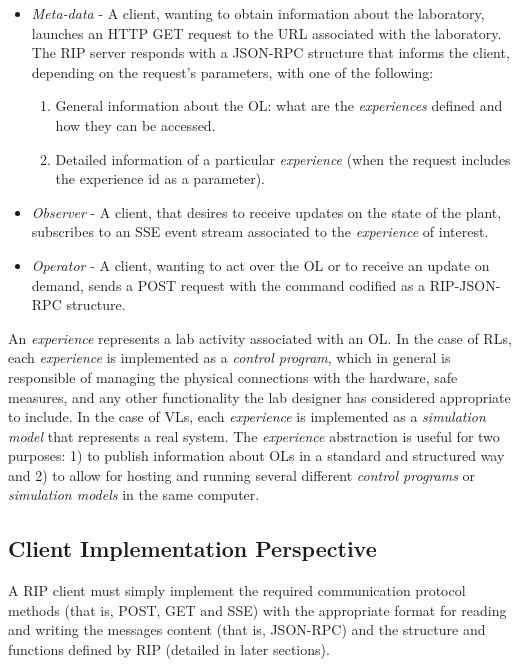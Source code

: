 \begin{itemize}
    \item \emph{Meta-data} - A client, wanting to obtain information about the laboratory, launches an HTTP GET request to the URL associated with the laboratory. The RIP server responds with a JSON-RPC structure that informs the client, depending on the request's parameters, with one of the following:
    
    \begin{enumerate}
        \item General information about the OL: what are the \textit{experiences} defined and how they can be accessed.
        \item Detailed information of a particular \textit{experience} (when the request includes the {experience} id as a parameter).
    \end{enumerate}
    
    \item \emph{Observer} - A client, that desires to receive updates on the state of the plant, subscribes to an SSE event stream associated to the \textit{experience} of interest.
    
    \item \emph{Operator} - A client, wanting to act over the OL or to receive an update on demand, sends a POST request with the command codified as a RIP-JSON-RPC structure.
\end{itemize}

An \textit{experience} represents a lab activity associated with an OL. In the case of RLs, each \textit{experience} is implemented as a \textit{control program}, which in general is responsible of managing the physical connections with the hardware, safe measures, and any other functionality the lab designer has considered appropriate to include. In the case of VLs, each \textit{experience} is implemented as a \textit{simulation model} that represents a real system. The \textit{experience} abstraction is useful for two purposes: 1) to publish information about OLs in a standard and structured way and 2) to allow for hosting and running several different \textit{control programs} or \textit{simulation models} in the same computer.

\subsection{Client Implementation Perspective}
A RIP client must simply implement the required communication protocol methods (that is, POST, GET and SSE) with the appropriate format for reading and writing the messages content (that is, JSON-RPC) and the structure and functions defined by RIP (detailed in later sections).

